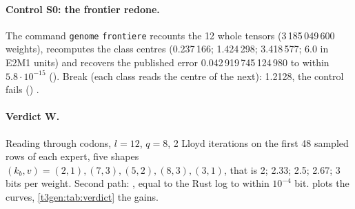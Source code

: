 \paragraph{Control S0: the frontier redone.} The command \texttt{genome} \texttt{frontiere} recounts the 12 whole tensors (3\,185\,049\,600 weights), recomputes the class centres (0.237\,166; 1.424\,298; 3.418\,577; 6.0 in E2M1 units) and recovers the published error 0.042\,919\,745\,124\,980 to within $5.8\cdot10^{-15}$ (). Break (each class reads the centre of the next): 1.2128, the control fails () \mes.

\paragraph{Verdict W.} Reading through codons, $l = 12$, $q = 8$, 2 Lloyd iterations on the first 48 sampled rows of each expert, five shapes $(k_b, v) = (2, 1), (7, 3), (5, 2), (8, 3), (3, 1)$, that is 2; 2.33; 2.5; 2.67; 3 bits per weight. Second path: , equal to the Rust log to within $10^{-4}$ bit.  plots the curves, \cref{t3gen:tab:verdict} the gains.

\begin{figure}[tbp]
\centering
\GrapheGenCourbes
{}
\label{fig:t3-gen-courbes}
\end{figure}

